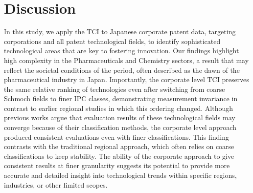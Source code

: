\section*{Discussion} \label{section:Discussion}

In this study, we apply the TCI to Japanese corporate patent data, targeting corporations and all patent technological fields, to identify sophisticated technological areas that are key to fostering innovation.  
Our findings highlight high complexity in the Pharmaceuticals and Chemistry sectors, a result that may reflect the societal conditions of the period, often described as the dawn of the pharmaceutical industry in Japan.  
Importantly, the corporate level TCI preserves the same relative ranking of technologies even after switching from coarse Schmoch fields to finer IPC classes, demonstrating measurement invariance in contrast to earlier regional studies in which this ordering changed.  
Although previous works argue that evaluation results of these technological fields may converge because of their classification methods\cite{Hidalgo2021}, the corporate level approach produced consistent evaluations even with finer classifications.  
This finding contrasts with the traditional regional approach, which often relies on coarse classifications to keep stability.  
The ability of the corporate approach to give consistent results at finer granularity suggests its potential to provide more accurate and detailed insight into technological trends within specific regions, industries, or other limited scopes.

